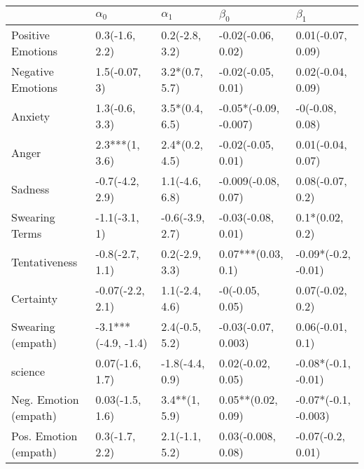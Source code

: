 \begin{tabular}{lllll}
\toprule
{} &           $\alpha_0$ &       $\alpha_1$ &              $\beta_0$ &             $\beta_1$ \\
\midrule
Positive Emotions     &       0.3(-1.6, 2.2) &   0.2(-2.8, 3.2) &     -0.02(-0.06, 0.02) &     0.01(-0.07, 0.09) \\
Negative Emotions     &        1.5(-0.07, 3) &   3.2*(0.7, 5.7) &     -0.02(-0.05, 0.01) &     0.02(-0.04, 0.09) \\
Anxiety               &       1.3(-0.6, 3.3) &   3.5*(0.4, 6.5) &  -0.05*(-0.09, -0.007) &       -0(-0.08, 0.08) \\
Anger                 &       2.3***(1, 3.6) &   2.4*(0.2, 4.5) &     -0.02(-0.05, 0.01) &     0.01(-0.04, 0.07) \\
Sadness               &      -0.7(-4.2, 2.9) &   1.1(-4.6, 6.8) &    -0.009(-0.08, 0.07) &      0.08(-0.07, 0.2) \\
Swearing Terms        &        -1.1(-3.1, 1) &  -0.6(-3.9, 2.7) &     -0.03(-0.08, 0.01) &       0.1*(0.02, 0.2) \\
Tentativeness         &      -0.8(-2.7, 1.1) &   0.2(-2.9, 3.3) &     0.07***(0.03, 0.1) &   -0.09*(-0.2, -0.01) \\
Certainty             &     -0.07(-2.2, 2.1) &   1.1(-2.4, 4.6) &        -0(-0.05, 0.05) &      0.07(-0.02, 0.2) \\
Swearing (empath)     &  -3.1***(-4.9, -1.4) &   2.4(-0.5, 5.2) &    -0.03(-0.07, 0.003) &      0.06(-0.01, 0.1) \\
science               &      0.07(-1.6, 1.7) &  -1.8(-4.4, 0.9) &      0.02(-0.02, 0.05) &   -0.08*(-0.1, -0.01) \\
Neg. Emotion (empath) &      0.03(-1.5, 1.6) &    3.4**(1, 5.9) &     0.05**(0.02, 0.09) &  -0.07*(-0.1, -0.003) \\
Pos. Emotion (empath) &       0.3(-1.7, 2.2) &   2.1(-1.1, 5.2) &     0.03(-0.008, 0.08) &     -0.07(-0.2, 0.01) \\
\bottomrule
\end{tabular}
